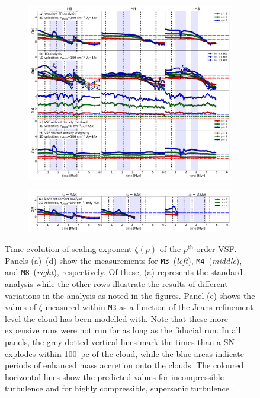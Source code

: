 \begin{figure}[!htb]
	\centering  
  
  \begin{subfigure}[c]{\textwidth}
      \includegraphics[width=\textwidth]{zeta_all_nojeans.pdf}
      \label{pic:results:zeta_all_nojeans}
  \end{subfigure}
  \begin{subfigure}[c]{\textwidth}
      \addtocounter{subfigure}{4}
      \includegraphics[width=\textwidth]{zeta_jeans.pdf}
      \label{pic:results:zeta_all_jeans}
  \end{subfigure}
  
  \caption{Time evolution of scaling exponent $\zeta(p)$ of the $p^\mathrm{th}$ order VSF. Panels (a)--(d) show the measurements for \texttt{M3}~(\textit{left}), \texttt{M4}~(\textit{middle}), and \texttt{M8}~(\textit{right}), respectively. Of these, (a) represents the standard analysis while the other rows illustrate the results of different variations in the analysis as noted in the figures. Panel (e) shows the values of $\zeta$ measured within \texttt{M3} as a function of the Jeans refinement level the cloud has been modelled with. Note that these more expensive runs were not run for as long as the fiducial run.  In all panels, the grey dotted vertical lines mark the times than a SN explodes within 100~pc of the cloud, while the blue areas indicate periods of enhanced mass accretion onto the clouds. The coloured horizontal lines show the predicted values for incompressible turbulence \citep[dash-dotted lines;][]{She1994} and for highly compressible, supersonic turbulence \citep[dashed lines;][]{Boldyrev2002}.
	\label{pic:results:zeta_all}
}
\end{figure}


